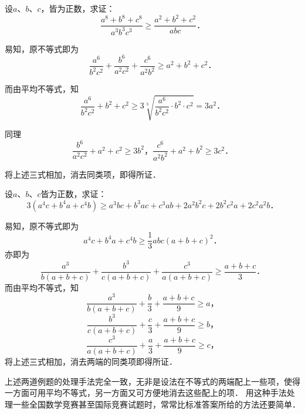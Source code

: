\documentclass[a4paper]{ctexart}
\newcommand{\zm}{{\heiti{证\quad}}}
\begin{document}
    \begin{LiTi}
        \item 设$a$、$b$、$c$，皆为正数，求证：
            \[\frac{a^8+b^8+c^8}{a^3 b^3 c^3}\geqslant \frac{a^2+b^2+c^2}{abc}\text{．}\] \par
            \zm 易知，原不等式即为
            \[\frac{a^6}{b^2 c^2}+\frac{b^6}{a^2 c^2}+\frac{c^6}{a^2 b^2}\geqslant a^2+b^2+c^2\text{．}\] \par 
            而由平均不等式，知
            \[\frac{a^6}{b^2 c^2}+b^2+c^2\geqslant 3\sqrt[3]{\frac{a^6}{b^2 c^2}\cdot b^2\cdot c^2}=3a^2\text{．}\] \par 
            同理
            \[\frac{b^6}{a^2 c^2}+a^2+c^2\geqslant 3b^2\text{，}\frac{c^6}{a^2 b^2}+a^2+b^2\geqslant 3c^2\text{．}\]\par 
            将上述三式相加，消去同类项，即得所证．
        \item 设$a$、$b$、$c$皆为正数，求证：
            \[3(a^4 c+b^4 a+c^4 b)\geqslant a^3 bc+b^3 ac+c^3 ab+2a^2 b^2 c+2b^2 c^2 a+2c^2 a^2 b\text{．}\]\par 
            \zm 易知，原不等式即为
            \[a^4 c+b^4 a+c^4 b\geqslant \frac{1}{3} abc\left(a+b+c\right)^2\text{．}\]
            亦即为
            \[\frac{a^3}{b(a+b+c)}+\frac{b^3}{c(a+b+c)}+\frac{c^3}{a(a+b+c)}\geqslant \frac{a+b+c}{3}\text{．}\]
            而由平均不等式，知
            \[\frac{a^3}{b(a+b+c)}+\frac{b}{3}+\frac{a+b+c}{9}\geqslant a\text{，}\]
            \[\frac{b^3}{c(a+b+c)}+\frac{c}{3}+\frac{a+b+c}{9}\geqslant b\text{，}\]
            \[\frac{c^3}{a(a+b+c)}+\frac{a}{3}+\frac{a+b+c}{9}\geqslant c\text{，}\]
            将上述三式相加，消去两端的同类项即得所证．\par
            上述两道例题的处理手法完全一致，无非是设法在不等式的两端配上一些项，使得一方面可用平均不等式，另一方面又可方便地消去这些配上的项．
            用这种手法处理一些全国数学竞赛甚至国际竞赛试题时，常常比标准答案所给的方法还要简单．
    \end{LiTi}
\end{document}
